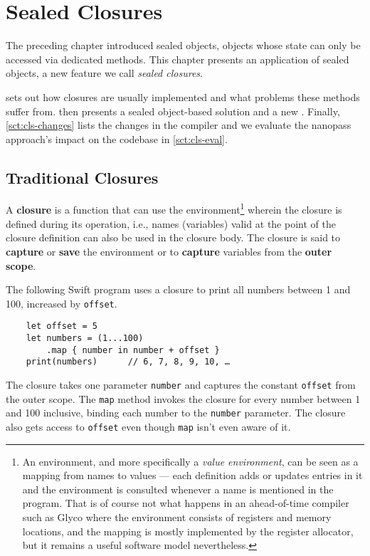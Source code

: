 \documentclass[main.tex]{subfiles}
\begin{document}
\onlyinsubfile{\mainmatter{}}

\chapter{Sealed Closures} \label{ch:cls}
The preceding chapter introduced sealed objects, objects whose state can only be accessed via dedicated methods. This chapter presents an application of sealed objects, a new feature we call \emph{sealed closures}.

 sets out how closures are usually implemented and what problems these methods suffer from.  then presents a sealed object-based solution and a new . Finally, \cref{sct:cls-changes} lists the changes in the compiler and we evaluate the nanopass approach's impact on the codebase in \cref{sct:cls-eval}.

\section{Traditional Closures} \label{sct:cls-trad}
A \textbf{closure} is a function that can use the environment\footnote{An environment, and more specifically a \emph{value environment}, can be seen as a mapping from names to values — each definition adds or updates entries in it and the environment is consulted whenever a name is mentioned in the program. That is of course not what happens in an ahead-of-time compiler such as Glyco where the environment consists of registers and memory locations, and the mapping is mostly implemented by the register allocator, but it remains a useful software model nevertheless.} wherein the closure is defined during its operation, i.e., names (variables) valid at the point of the closure definition can also be used in the closure body. The closure is said to \textbf{capture} or \textbf{save} the environment or to \textbf{capture} variables from the \textbf{outer scope}.

The following Swift program uses a closure to print all numbers between 1 and 100, increased by \texttt{offset}.
\begin{verbatim}
	let offset = 5
	let numbers = (1...100)
		.map { number in number + offset }
	print(numbers)		// 6, 7, 8, 9, 10, …
\end{verbatim}
The closure takes one parameter \texttt{number} and captures the constant \texttt{offset} from the outer scope. The \texttt{map} method invokes the closure for every number between 1 and 100 inclusive, binding each number to the \texttt{number} parameter. The closure also gets access to \texttt{offset} even though \texttt{map} isn't even aware of it.
\end{document}
